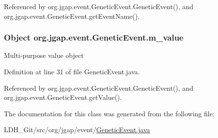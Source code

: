 Referenced by org.\-jgap.\-event.\-Genetic\-Event.\-Genetic\-Event(), and org.\-jgap.\-event.\-Genetic\-Event.\-get\-Event\-Name().

\hypertarget{classorg_1_1jgap_1_1event_1_1_genetic_event_a1a6297ab19f2f7b68ddbc3d34d803998}{
\subsubsection[{m\-\_\-value}]{\setlength{\rightskip}{0pt plus 5cm}Object org.\-jgap.\-event.\-Genetic\-Event.\-m\-\_\-value\hspace{0.3cm}{\ttfamily [private]}}}\label{classorg_1_1jgap_1_1event_1_1_genetic_event_a1a6297ab19f2f7b68ddbc3d34d803998}
Multi-\/purpose value object 

Definition at line 31 of file Genetic\-Event.\-java.



Referenced by org.\-jgap.\-event.\-Genetic\-Event.\-Genetic\-Event(), and org.\-jgap.\-event.\-Genetic\-Event.\-get\-Value().



The documentation for this class was generated from the following file\-:\begin{DoxyCompactItemize}
\item 
L\-D\-H\-\_\-\-Git/src/org/jgap/event/\hyperlink{_genetic_event_8java}{Genetic\-Event.\-java}\end{DoxyCompactItemize}
